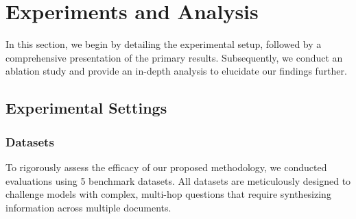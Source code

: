 \section{Experiments and Analysis}
In this section, we begin by detailing the experimental setup, followed by a comprehensive presentation of the primary results. Subsequently, we conduct an ablation study and provide an in-depth analysis to elucidate our findings further.

\subsection{Experimental Settings}


\subsubsection{Datasets}
To rigorously assess the efficacy of our proposed methodology, we conducted evaluations using 5 benchmark datasets. All datasets are meticulously designed to challenge models with complex, multi-hop questions that require synthesizing information across multiple documents.

